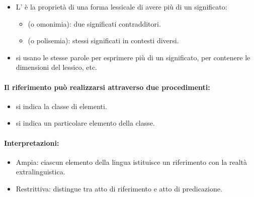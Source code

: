 \begin{itemize}
  \item L' è la proprietà di una forma lessicale di avere più di un significato:
    \begin{itemize}
      \item {} (o omonimia): due significati contradditori. 
      \item {} (o polisemia): stessi significati in contesti diversi.
    \end{itemize}
  \item {} si usano le stesse parole per esprimere più di un significato, per contenere le dimensioni del lessico, etc.
\end{itemize}



\paragraph{Il riferimento può realizzarsi attraverso due procedimenti:}

\begin{itemize}
  \item {} si indica la classe di elementi. 
  \item {} si indica un particolare elemento della classe. 
\end{itemize}

\paragraph{Interpretazioni:}

\begin{itemize}
  \item Ampia: ciascun elemento della lingua istituisce un riferimento con la realtà extralinguistica. 
  \item Restrittiva: distingue tra atto di riferimento e atto di predicazione.
\end{itemize}

